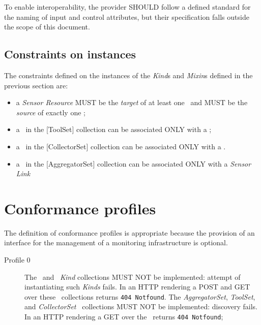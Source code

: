 \documentclass[12pt]{article}  %
\begin{document}
{To enable interoperability, the provider SHOULD follow a defined standard for the naming of input and control attributes, but their specification falls outside the scope of this document.

\subsection{Constraints on instances}

The constraints defined on the instances of the {\em Kind}s and {\em Mixin}s defined in the previous section are:

\begin{itemize}

\item a {\em Sensor Resource} MUST be the {\em target} of at least one \coll\ and MUST be the {\em source} of exactly one \coll;

\item a \mi\ in the [{ToolSet}] collection can be associated ONLY with a \coll;

\item a \mi\ in the [{CollectorSet}] collection can be associated ONLY with a \coll.

\item a \mi\ in the [{AggregatorSet}] collection can be associated ONLY with a {\em Sensor Link}

\end{itemize}


\section{Conformance profiles}

The definition of conformance profiles is appropriate because the provision of an interface for the management of a monitoring infrastructure is optional. 

\begin{description}

\item[Profile 0] The \coll\ and \sens\ {\em Kind} collections MUST NOT be implemented: attempt of instantiating such {\em Kinds} fails.  In an HTTP rendering a POST and GET over these \rs\ collections returns {\tt 404 Notfound}. The {\em AggregatorSet}, {\em ToolSet}, and {\em CollectorSet} \mi\ collections MUST NOT be implemented: discovery fails. In an HTTP rendering a GET over the \mi\ returns {\tt 404 Notfound}; 


\end{description}}
\end{document}
